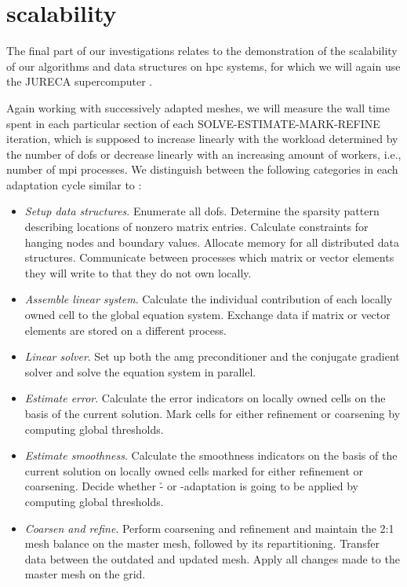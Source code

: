\section{ scalability}
\label{sec:scaling}

The final part of our investigations relates to the demonstration of the scalability of our algorithms and data structures on \gls{hpc} systems, for which we will again use the JURECA supercomputer \parencite{krause2016,jureca}.

Again working with successively adapted meshes, we will measure the wall time spent in each particular section of each SOLVE-ESTIMATE-MARK-REFINE iteration, which is supposed to increase linearly with the workload determined by the number of \glspl{dof} or decrease linearly with an increasing amount of workers, i.e., number of \gls{mpi} processes. We distinguish between the following categories in each adaptation cycle similar to \textcite{bangerth2012}:
\begin{itemize}
\item \textit{Setup data structures}. Enumerate all \glspl{dof}. Determine the sparsity pattern describing locations of nonzero matrix entries. Calculate constraints for hanging nodes and boundary values. Allocate memory for all distributed data structures. Communicate between processes which matrix or vector elements they will write to that they do not own locally.
\item \textit{Assemble linear system}. Calculate the individual contribution of each locally owned cell to the global equation system. Exchange data if matrix or vector elements are stored on a different process.
\item \textit{Linear solver}. Set up both the \gls{amg} preconditioner and the conjugate gradient solver and solve the equation system in parallel.
\item \textit{Estimate error}. Calculate the error indicators on locally owned cells on the basis of the current solution. Mark cells for either refinement or coarsening by computing global thresholds.
\item \textit{Estimate smoothness}. Calculate the smoothness indicators on the basis of the current solution on locally owned cells marked for either refinement or coarsening. Decide whether \h- or \p-adaptation is going to be applied by computing global thresholds.
\item \textit{Coarsen and refine}. Perform coarsening and refinement and maintain the 2:1 mesh balance on the \pforest{} master mesh, followed by its repartitioning. Transfer data between the outdated and updated mesh. Apply all changes made to the master mesh on the \dealii{} grid.
\end{itemize}

